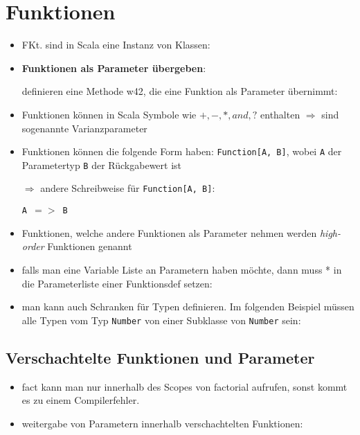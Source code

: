 \section{Funktionen}
\begin{itemize}
  \item FKt. sind in Scala eine Instanz von Klassen:
  
  
  
  \item \textbf{Funktionen als Parameter übergeben}:
  
  definieren eine Methode w42, die eine Funktion als Parameter übernimmt:
  
  

  \item Funktionen können in Scala Symbole wie $+, -, *, and, ?$ enthalten
  $\Rightarrow$ sind sogenannte Varianzparameter
  \item Funktionen können die folgende Form
  haben: \texttt{Function[A, B]}, wobei \texttt{A} der Parametertyp 
  \und \texttt{B} der Rückgabewert ist
  
  $\Rightarrow$ andere Schreibweise für \texttt{Function[A, B]}:
  
  \begin{center}
    \texttt{A $=>$ B}
  \end{center}
    
  \item Funktionen, welche andere Funktionen als Parameter nehmen werden
  \textit{high-order} Funktionen genannt
    \item falls man eine Variable Liste an Parametern haben möchte, dann muss *
  in die Parameterliste einer Funktionsdef setzen:
  

    
  \item man kann auch Schranken für Typen definieren. Im folgenden Beispiel müssen alle Typen vom Typ \texttt{Number} \oder von einer Subklasse von
  \texttt{Number} sein:
  
  

\end{itemize}


\subsection{Verschachtelte Funktionen und Parameter}
\begin{itemize}
  \item   
  
  fact kann man nur innerhalb des Scopes von factorial aufrufen, sonst kommt
  es zu einem Compilerfehler.
  
  \item weitergabe von Parametern innerhalb verschachtelten Funktionen:
  
    

\end{itemize}


